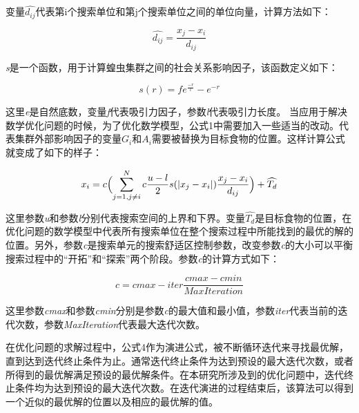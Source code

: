 变量$\widehat{d_{ij}}$代表第i个搜索单位和第j个搜索单位之间的单位向量，计算方法如下：

\begin{equation}
    \widehat{d_{ij}}=\frac{x_j-x_i}{d_{ij}}
\end{equation}

\emph{s}是一个函数，用于计算蝗虫集群之间的社会关系影响因子，该函数定义如下：

\begin{equation}
    s(r) = fe^{\frac{-r}{l}}-e^{-r}
\end{equation}

这里\emph{e}是自然底数，变量\emph{f}代表吸引力因子，参数\emph{l}代表吸引力长度。
当应用于解决数学优化问题的时候，为了优化数学模型，公式1中需要加入一些适当的改动。代表集群外部影响因子的变量$G_i$和$A_i$需要被替换为目标食物的位置。这样计算公式就变成了如下的样子：

\begin{equation}
    x_i = c \Bigl(\sum_{j=1,j\neq{i}}^N c \frac{u-l}{2}s (\lvert x_j-x_i \rvert )\frac{x_j-x_i}{d_{ij}} \Bigr) + \widehat{T_d}
\end{equation}

这里参数\emph{u}和参数\emph{l}分别代表搜索空间的上界和下界。变量$\widehat{T_d}$是目标食物的位置，在优化问题的数学模型中代表所有搜索单位在整个搜索过程中所能找到的最优的解的位置。另外，参数\emph{c}是搜索单元的搜索舒适区控制参数，改变参数\emph{c}的大小可以平衡搜索过程中的“开拓”和“探索”两个阶段。参数\emph{c}的计算方式如下：

\begin{equation}
    c = cmax - iter \frac{cmax - cmin}{MaxIteration}
\end{equation}


这里参数\emph{cmax}和参数\emph{cmin}分别是参数\emph{c}的最大值和最小值，参数\emph{iter}代表当前的迭代次数，参数\emph{MaxIteration}代表最大迭代次数。

在优化问题的求解过程中，公式4作为演进公式，被不断循环迭代来寻找最优解，直到达到迭代终止条件为止。通常迭代终止条件为达到预设的最大迭代次数，或者所得到的最优解满足预设的最优解条件。在本研究所涉及到的优化问题中，迭代终止条件均为达到预设的最大迭代次数。在迭代演进的过程结束后，该算法可以得到一个近似的最优解的位置以及相应的最优解的值。

